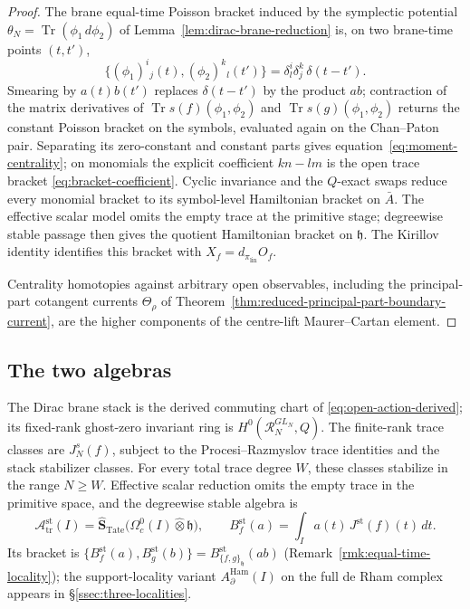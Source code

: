 \documentclass[11pt]{memoir}
\begin{document}
\begin{proof}
  The brane equal-time Poisson bracket induced by the symplectic
  potential \(\theta_N=\operatorname{Tr}(\phi_1\,d\phi_2)\) of
  Lemma~\ref{lem:dirac-brane-reduction} is, on two brane-time points
  \((t,t')\),
  \[
    \{(\phi_1)^i{}_j(t),(\phi_2)^k{}_l(t')\}
      =\delta^i_l\delta^k_j\,\delta(t-t').
  \]
  Smearing by \(a(t)b(t')\) replaces \(\delta(t-t')\) by the product
  \(ab\); contraction of the matrix derivatives of
  \(\operatorname{Tr}s(f)(\phi_1,\phi_2)\) and
  \(\operatorname{Tr}s(g)(\phi_1,\phi_2)\) returns the constant Poisson
  bracket on the symbols, evaluated again on the Chan--Paton pair.
  Separating its zero-constant and constant parts gives
  equation~\eqref{eq:moment-centrality}; on monomials the explicit
  coefficient \(kn-lm\) is the open trace bracket
  \eqref{eq:bracket-coefficient}.  Cyclic invariance and the
  \(Q\)-exact swaps reduce every monomial bracket to its symbol-level
  Hamiltonian bracket on \(\bar A\).  The effective scalar model omits
  the empty trace at the primitive stage; degreewise stable passage then
  gives the quotient Hamiltonian bracket on \(\mathfrak h\).  The
  Kirillov identity identifies this bracket with
  \(X_f=d_{\pi_{\mathrm{lin}}}O_f\).

  Centrality homotopies against arbitrary open observables, including
  the principal-part cotangent currents \(\Theta_\rho\) of
  Theorem~\ref{thm:reduced-principal-part-boundary-current}, are the
  higher components of the centre-lift Maurer--Cartan element.
\end{proof}

\subsection{The two algebras}\label{ssec:two-algebras}

The Dirac brane stack is the derived commuting chart of
\eqref{eq:open-action-derived}; its fixed-rank ghost-zero invariant ring
is \(H^0(\mathcal R_N^{GL_N},Q)\).  The finite-rank trace classes are
\(J_N^s(f)\), subject to the Procesi--Razmyslov trace identities and the
stack stabilizer classes.  For every total trace degree \(W\), these
classes stabilize in the range \(N\geq W\).  Effective scalar reduction
omits the empty trace in the primitive space, and the degreewise stable
algebra is
\[
  \mathcal A_{\mathrm{tr}}^{\mathrm{st}}(I)
   =\widehat{\mathbf S}_{\mathrm{Tate}}
     \bigl(\Omega^0_c(I)\widehat\otimes\mathfrak h\bigr),
  \qquad
  B_f^{\mathrm{st}}(a)=\int_I a(t)\,J^{\mathrm{st}}(f)(t)\,dt.
\]
Its bracket is
\(\{B_f^{\mathrm{st}}(a),B_g^{\mathrm{st}}(b)\}
=B_{\{f,g\}_{\mathfrak h}}^{\mathrm{st}}(ab)\)
(Remark~\ref{rmk:equal-time-locality}); the support-locality variant
\(A_\partial^{\mathrm{Ham}}(I)\) on the full de Rham complex appears
in \S\ref{ssec:three-localities}.
\end{document}
